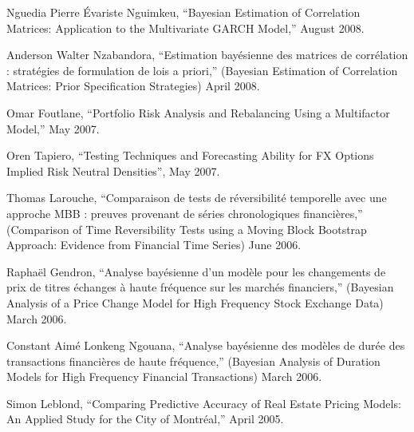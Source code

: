 \documentclass[12pt]{article}
\begin{document}
Nguedia Pierre \'Evariste Nguimkeu,
``Bayesian Estimation of Correlation Matrices:
Application to the Multivariate GARCH Model,''
August 2008.

Anderson Walter Nzabandora,
``Estimation bay\'esienne des matrices de corr\'elation : strat\'egies de formulation de lois a priori,''
(Bayesian Estimation of Correlation Matrices: Prior Specification Strategies)
April 2008.

Omar Foutlane,
``Portfolio Risk Analysis and Rebalancing Using a Multifactor Model,''
May 2007.

Oren Tapiero,
``Testing Techniques and Forecasting Ability for FX Options Implied Risk
Neutral Densities'',
May 2007.

Thomas Larouche,
``Comparaison de tests de r\'eversibilit\'e temporelle avec une approche MBB : preuves provenant de s\'eries chronologiques financi\`eres,''
(Comparison of Time Reversibility Tests using a Moving Block Bootstrap Approach: Evidence from Financial Time Series)
June 2006.

Rapha\"el Gendron,
``Analyse bay\'esienne d'un mod\`ele pour les changements de prix de titres \'echanges \`a haute fr\'equence sur les march\'es financiers,''
(Bayesian Analysis of a Price Change Model for High Frequency Stock Exchange
Data)
March 2006.

Constant Aim\'e Lonkeng Ngouana,
``Analyse bay\'esienne des mod\`eles de dur\'ee des transactions financi\`eres de haute fr\'equence,''
(Bayesian Analysis of Duration Models for High Frequency Financial Transactions)
March 2006.

Simon Leblond,
``Comparing Predictive Accuracy of Real Estate Pricing Models: An Applied Study for the City of Montr\'eal,''
April 2005.
\end{document}
